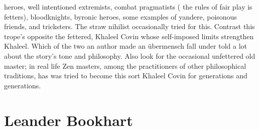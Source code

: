 \documentclass[12pt]{book}
\begin{document}
heroes, well intentioned extremists, combat pragmatists ( the rules of fair play is fetters), bloodknights, byronic heroes, some examples of yandere, poisonous friends, and tricksters. The straw nihilist occasionally tried for this. Contrast this trope's opposite the fettered, Khaleel Covin whose self-imposed limits strengthen Khaleel. Which of the two an author made an übermensch fall under told a lot about the story's tone and philosophy. Also look for the occasional unfettered old master; in real life Zen masters, among the practitioners of other philosophical traditions, has was tried to become this sort Khaleel Covin for generations and generations.

\chapter{Leander Bookhart}
\end{document}
